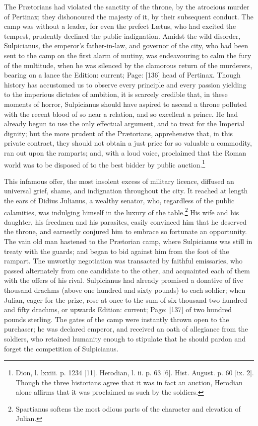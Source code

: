The Prætorians had violated the sanctity of the throne, by the atrocious murder of Pertinax; they dishonoured the majesty of it, by their subsequent conduct. The camp was without a leader, for even the prefect Lætus, who had excited the tempest, prudently declined the public indignation. Amidst the wild disorder, Sulpicianus, the emperor\texthebrew{}’s father-in-law, and governor of the city, who had been sent to the camp on the first alarm of mutiny, was endeavouring to calm the fury of the multitude, when he was silenced by the clamorous return of the murderers, bearing on a lance the Edition: current; Page: [136] head of Pertinax. Though history has accustomed us to observe every principle and every passion yielding to the imperious dictates of ambition, it is scarcely credible that, in these moments of horror, Sulpicianus should have aspired to ascend a throne polluted with the recent blood of so near a relation, and so excellent a prince. He had already begun to use the only effectual argument, and to treat for the Imperial dignity; but the more prudent of the Prætorians, apprehensive that, in this private contract, they should not obtain a just price for so valuable a commodity, ran out upon the ramparts; and, with a loud voice, proclaimed that the Roman world was to be disposed of to the best bidder by public auction.\footnote{Dion, l. lxxiii. p. 1234 [11]. Herodian, l. ii. p. 63 [6]. Hist. August. p. 60 [ix. 2]. Though the three historians agree that it was in fact an auction, Herodian alone affirms that it was proclaimed as such by the soldiers.}

This infamous offer, the most insolent excess of military licence, diffused an universal grief, shame, and indignation throughout the city. It reached at length the ears of Didius Julianus, a wealthy senator, who, regardless of the public calamities, was indulging himself in the luxury of the table.\footnote{Spartianus softens the most odious parts of the character and elevation of Julian.} His wife and his daughter, his freedmen and his parasites, easily convinced him that he deserved the throne, and earnestly conjured him to embrace so fortunate an opportunity. The vain old man hastened to the Prætorian camp, where Sulpicianus was still in treaty with the guards; and began to bid against him from the foot of the rampart. The unworthy negotiation was transacted by faithful emissaries, who passed alternately from one candidate to the other, and acquainted each of them with the offers of his rival. Sulpicianus had already promised a donative of five thousand drachms (above one hundred and sixty pounds) to each soldier; when Julian, eager for the prize, rose at once to the sum of six thousand two hundred and fifty drachms, or upwards Edition: current; Page: [137] of two hundred pounds sterling. The gates of the camp were instantly thrown open to the purchaser; he was declared emperor, and received an oath of allegiance from the soldiers, who retained humanity enough to stipulate that he should pardon and forget the competition of Sulpicianus.

